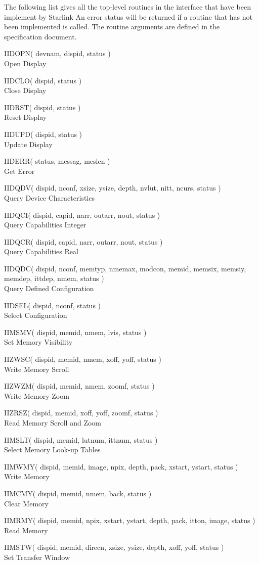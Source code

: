 \documentclass[11pt,nolof]{starlink}
\providecommand{\routinehead}[1]{\vspace{\bigskipamount}{\large\bf#1}}
\newenvironment{routinelist}{\begin{list}{}{\setlength{\leftmargin}{2cm}
                             \setlength{\parsep}{\smallskipamount}}}{\end{list}}
\providecommand{\noteroutine}[2]{\item\hspace{-1cm}#1#2\\}
\begin{document}
The following list gives all the top-level routines in the interface that
have been implement by Starlink
An error status will be returned if a routine that has not been implemented
is called. The routine arguments are defined in the specification
document.

\routinehead{Control}
\begin{routinelist}
\noteroutine{IIDOPN}{( devnam, dispid, status )}
              {Open Display}
\noteroutine{IIDCLO}{( dispid, status )}
               {Close Display}
\noteroutine{IIDRST}{( dispid, status )}
               {Reset Display}
\noteroutine{IIDUPD}{( dispid, status )}
               {Update Display}
\noteroutine{IIDERR}{( status, messag, meslen )}
               {Get Error}
\end{routinelist}
\routinehead{Configuration}
\begin{routinelist}
\noteroutine{IIDQDV}{( dispid, nconf, xsize, ysize, depth, nvlut, nitt, ncurs,
                        status )}
               {Query Device Characteristics}
\noteroutine{IIDQCI}{( dispid, capid, narr, outarr, nout, status )}
               {Query Capabilities Integer}
\noteroutine{IIDQCR}{( dispid, capid, narr, outarr, nout, status )}
               {Query Capabilities Real}
\noteroutine{IIDQDC}{( dispid, nconf, memtyp, nmemax, modcon, memid, memsix,
                        memsiy,
               memdep, ittdep, nmem, status )}
               {Query Defined Configuration}
\noteroutine{IIDSEL}{( dispid, nconf, status )}
               {Select Configuration}
\end{routinelist}
\routinehead{Memories}
\begin{routinelist}
\noteroutine{IIMSMV}{( dispid, memid, nmem, lvis, status )}
               {Set Memory Visibility}
\noteroutine{IIZWSC}{( dispid, memid, nmem, xoff, yoff, status )}
               {Write Memory Scroll}
\noteroutine{IIZWZM}{( dispid, memid, nmem, zoomf, status )}
               {Write Memory Zoom}
\noteroutine{IIZRSZ}{( dispid, memid, xoff, yoff, zoomf, status )}
               {Read Memory Scroll and Zoom}
\noteroutine{IIMSLT}{( dispid, memid, lutnum, ittnum, status )}
               {Select Memory Look-up Tables}
\noteroutine{IIMWMY}{( dispid, memid, image, npix, depth, pack, xstart, ystart,
                        status )}
               {Write Memory}
\noteroutine{IIMCMY}{( dispid, memid, nmem, back, status )}
               {Clear Memory}
\noteroutine{IIMRMY}{( dispid, memid, npix, xstart, ystart, depth, pack, itton,
                        image, status )}
               {Read Memory}
\noteroutine{IIMSTW}{( dispid, memid, direcn, xsize, ysize, depth, xoff, yoff,
                        status )}
               {Set Transfer Window}
\end{routinelist}
\end{document}
